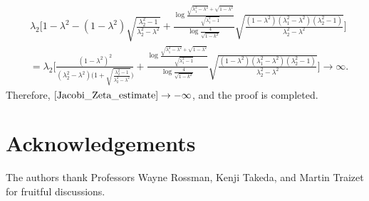 \documentclass[11pt]{amsart}
\numberwithin{equation}{section}
\numberwithin{figure}{section}
\theoremstyle{plain} %
\theoremstyle{definition} %
\begin{document}
\begin{align*}
& \lambda_2 \bigg[ 1-\lambda^2 -(1-\lambda^2)\sqrt{ \frac{\lambda_2^2-1}{\lambda_2^2-\lambda^2}}
+\frac{\log \frac{\sqrt{\lambda_1^2-\lambda^2}+\sqrt{1-\lambda^2}}{\sqrt{\lambda_1^2-1}}}{\log \frac{4}{\sqrt{1-k^2}}} 
\sqrt{ \frac{(1-\lambda^2)(\lambda_1^2-\lambda^2)(\lambda_2^2-1)}{\lambda_2^2-\lambda^2}}\bigg] \\
&=\lambda_2 \bigg[ \frac{(1-\lambda^2)^2}{(\lambda_2^2-\lambda^2) \bigg( 1+\sqrt{ \frac{\lambda_2^2-1}{\lambda_2^2-\lambda^2}} \bigg)} %
+\frac{\log \frac{\sqrt{\lambda_1^2-\lambda^2}+\sqrt{1-\lambda^2}}{\sqrt{\lambda_1^2-1}}}{\log \frac{4}{\sqrt{1-k^2}}} 
\sqrt{ \frac{(1-\lambda^2)(\lambda_1^2-\lambda^2)(\lambda_2^2-1)}{\lambda_2^2-\lambda^2}}\bigg] 
\to \infty.
\end{align*}
Therefore, $\eqref{Jacobi_Zeta_estimate}\to -\infty$, and the proof is completed. 

\section*{Acknowledgements}
The authors thank Professors Wayne Rossman, Kenji Takeda, and Martin Traizet for fruitful discussions. 
\end{document}
